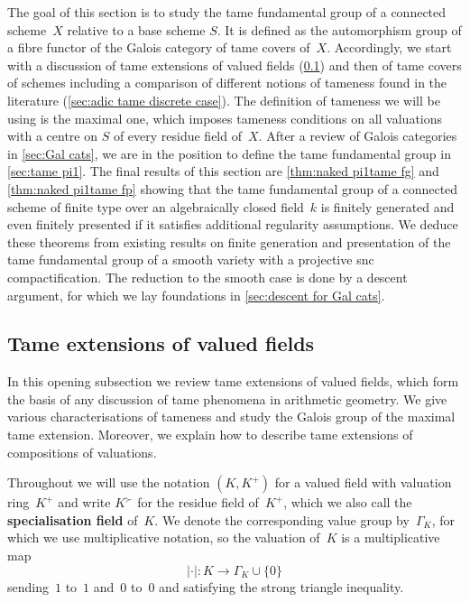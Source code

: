 \documentclass[a4paper,twoside,11pt,reqno]{amsart}
\theoremstyle{definition}
\numberwithin{equation}{subsection}
\begin{document}
The goal of this section is to study the tame fundamental group of a connected scheme~$X$ relative to a base scheme $S$.
It is defined as the automorphism group of a fibre functor of the Galois category of tame covers of~$X$.
Accordingly, we start with a discussion of tame extensions of valued fields (\cref{sec:tame extensions valued fields}) and then of tame covers of schemes including a comparison of different notions of tameness found in the literature (\cref{sec:adic tame discrete case}).
The definition of tameness we will be using is the maximal one, which imposes tameness conditions on all valuations with a centre on $S$ of every residue field of~$X$. 
After a review of Galois categories in \cref{sec:Gal cats}, we are in the position to define the tame fundamental group in \cref{sec:tame pi1}.
The final results of this section are \cref{thm:naked pi1tame fg} and \cref{thm:naked pi1tame fp} showing that the tame fundamental group of a connected scheme of finite type over an algebraically closed field~$k$ is finitely generated and even finitely presented if it satisfies additional regularity assumptions.
We deduce these theorems from existing results \cite{EsnaultShustermanSrinivas2022:FinitePresentationTame} on finite generation and presentation of the tame fundamental group of a smooth variety with a projective snc compactification.
The reduction to the smooth case is done by a descent argument, for which we lay foundations in \cref{sec:descent for Gal cats}.

\subsection{Tame extensions of valued fields} 
\label{sec:tame extensions valued fields}

In this opening subsection we review tame extensions of valued fields, which form the basis of any discussion of tame phenomena in arithmetic geometry.
We give various characterisations of tameness and study the Galois group of the maximal tame extension.
Moreover, we explain how to describe tame extensions of compositions of valuations.

Throughout we will use the notation $(K,K^+)$ for a valued field with valuation ring~$K^+$ and write $K^\succ$ for the residue field of~$K^+$, which we also call the \textbf{specialisation field} of~$K$.
We denote the corresponding value group by~$\Gamma_K$, for which we use multiplicative notation, so the valuation of~$K$ is a multiplicative map
\[
 \lvert \cdot \rvert \colon K \longrightarrow \Gamma_K \cup \{0\}
\]
sending~$1$ to~$1$ and~$0$ to~$0$ and satisfying the strong triangle inequality.
\end{document}
